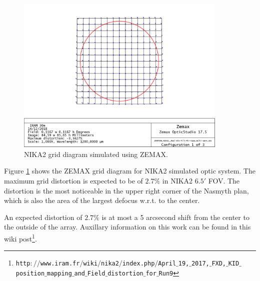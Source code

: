 \begin{figure}[ht] 
\begin{center}
  \includegraphics[width=0.9\textwidth]{Figures/NIKA2_Grid-distortion.png}
  \caption[Simulated FOV grid]{NIKA2 grid diagram simulated using
    ZEMAX.  
  }
 \label{fig:fov_grid_distortion_zemax}
\end{center}
\end{figure}

Figure \ref{fig:fov_grid_distortion_zemax} shows the ZEMAX grid diagram for
NIKA2 simulated optic system. The maximum grid distortion is expected
to be of $2.7\%$ in NIKA2 $6.5'$ FOV. The distortion is the most
noticeable in the upper right corner of the Nasmyth plan, which is
also the area of the largest defocus w.r.t. to the center. 

An expected distortion of $2.7\%$ is at most a 5 arcsecond shift from the
center to the outside of the array.
Auxillary information on this work can be found in this wiki post\footnote{\tiny
  {\tt http$://$www.iram.fr$/$wiki$/$nika2$/$index.php$/$April$\_$19,$\_$2017,$\_$FXD,$\_$KID$\_$position$\_$mapping$\_$and$\_$Field$\_$distortion$\_$for$\_$Run9}}.

